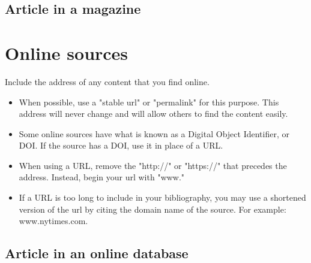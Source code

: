 {\subsection{Article in a magazine}


\section{Online sources}

\begin{center}
\begin{tcolorbox}[colframe=oyster, coltitle=black, sharp corners, title=\ding{52} URLs \& DOIs]

Include the address of any content that you find online.\smallskip

\begin{itemize}
\item When possible, use a "stable url" or "permalink" for this purpose. This address will never change and will allow others to find the content easily. 

\item Some online sources have what is known as a Digital Object Identifier, or DOI. If the source has a DOI, use it in place of a URL.

\item When using a URL, remove the "http://" or "https://" that precedes the address. Instead, begin your url with "www."

\item If a URL is too long to include in your bibliography, you may use a shortened version of the url by citing the domain name of the source. For example: www.nytimes.com.
\end{itemize}

\end{tcolorbox}
\end{center}

\subsection{Article in an online database}


}
